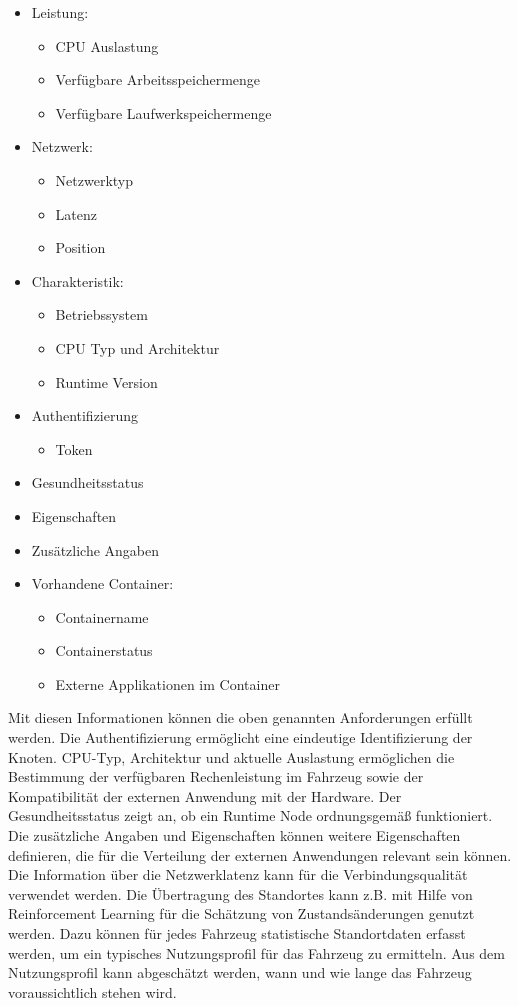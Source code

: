 \begin{itemize}
    \item Leistung: 
    \begin{itemize}
        \item CPU Auslastung
        \item Verfügbare Arbeitsspeichermenge
        \item Verfügbare Laufwerkspeichermenge
    \end{itemize} 
    \item Netzwerk:
    \begin{itemize}
        \item Netzwerktyp
        \item Latenz
        \item Position
    \end{itemize}
    \item Charakteristik:
    \begin{itemize}
        \item Betriebssystem
        \item CPU Typ und Architektur
        \item Runtime Version
    \end{itemize}
    \item Authentifizierung
    \begin{itemize}
        \item Token
    \end{itemize}
    \item Gesundheitsstatus
    \item Eigenschaften
    \item Zusätzliche Angaben
    \item Vorhandene Container:
    \begin{itemize}
        \item Containername
        \item Containerstatus
        \item Externe Applikationen im Container
    \end{itemize}
\end{itemize}

Mit diesen Informationen können die oben genannten Anforderungen erfüllt werden. Die Authentifizierung ermöglicht eine eindeutige Identifizierung der Knoten. CPU-Typ, Architektur und aktuelle Auslastung ermöglichen die Bestimmung der verfügbaren Rechenleistung im Fahrzeug sowie der Kompatibilität der externen Anwendung mit der Hardware. Der Gesundheitsstatus zeigt an, ob ein Runtime Node ordnungsgemäß funktioniert. Die zusätzliche Angaben und Eigenschaften können weitere Eigenschaften definieren, die für die Verteilung der externen Anwendungen relevant sein können. Die Information über die Netzwerklatenz kann für die Verbindungsqualität verwendet werden. Die Übertragung des Standortes kann z.B. mit Hilfe von Reinforcement Learning für die Schätzung von Zustandsänderungen genutzt werden. Dazu können für jedes Fahrzeug statistische Standortdaten erfasst werden, um ein typisches Nutzungsprofil für das Fahrzeug zu ermitteln. Aus dem Nutzungsprofil kann abgeschätzt werden, wann und wie lange das Fahrzeug voraussichtlich stehen wird. 

